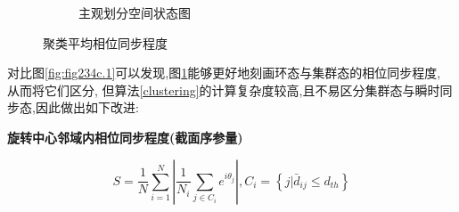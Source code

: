 \documentclass{article}
\begin{document}
\begin{figure}[H]
\begin{subfigure}[b]{0.49\textwidth}
		\vspace{-1cm}
		\caption{主观划分空间状态图}
	\end{subfigure}
	\vspace{-0.5cm}
	\caption{聚类平均相位同步程度}
	\label{fig:fig234c.5}
\end{figure}

\vspace{-0.5cm}
对比图\ref{fig:fig234c.1}可以发现,图\ref{fig:fig234c.5}能够更好地刻画环态与集群态的相位同步程度, 从而将它们区分, 但算法\ref{clustering}的计算复杂度较高,且不易区分集群态与瞬时同步态,因此做出如下改进:

\noindent\textbf{旋转中心邻域内相位同步程度(截面序参量)}

\vspace{-0.5cm}
$$
S=\frac{1}{N}\sum_{i=1}^N{\left| \frac{1}{N_i}\sum_{j\in C_i}{e^{i\theta _j}} \right|}, C_i=\left\{ j|\bar{d}_{ij}\le d_{th} \right\} 
$$
\end{document}
